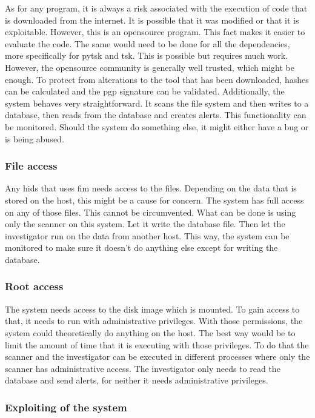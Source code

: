 As for any program, it is always a risk associated with the execution of code that is downloaded from the internet. It is possible that it was modified or that it is exploitable. However, this is an \gls{opensource} program. This fact makes it easier to evaluate the code. The same would need to be done for all the dependencies, more specifically for \gls{pytsk} and \gls{tsk}. This is possible but requires much work. However, the \gls{opensource} community is generally well trusted, which might be enough. To protect from alterations to the tool that has been downloaded, hashes can be calculated and the \gls{pgp} signature can be validated.
Additionally, the system behaves very straightforward. It scans the file system and then writes to a database, then reads from the database and creates alerts. This functionality can be monitored. Should the system do something else, it might either have a bug or is being abused.

\subsubsection{File access}
\label{sec:risk:file}

Any \gls{hids} that uses \gls{fim} needs access to the files. Depending on the data that is stored on the host, this might be a cause for concern. The system has full access on any of those files. This cannot be circumvented. What can be done is using only the scanner on this system. Let it write the database file. Then let the investigator run on the data from another host. This way, the system can be monitored to make sure it doesn't do anything else except for writing the database.

\subsubsection{Root access}
\label{sec:risk:root}

The system needs access to the disk image which is mounted. To gain access to that, it needs to run with administrative privileges. With those permissions, the system could theoretically do anything on the host. The best way would be to limit the amount of time that it is executing with those privileges. To do that the scanner and the investigator can be executed in different processes where only the scanner has administrative access. The investigator only needs to read the database and send alerts, for neither it needs administrative privileges.

\subsubsection{Exploiting of the system}
\label{sec:risk:unknowncode}

